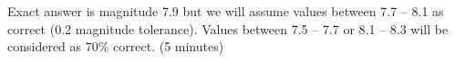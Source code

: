 
Exact answer is magnitude 7.9 but we will assume values between 7.7 -- 8.1 as
correct (0.2 magnitude tolerance). Values between 7.5 -- 7.7 or 8.1 -- 8.3
will be considered as 70\% correct. (5 minutes)
